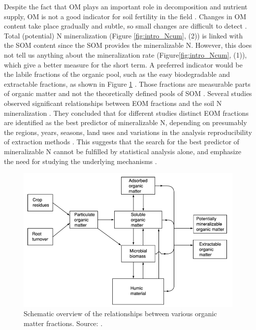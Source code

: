 \documentclass[10pt,twoside,dutch,english]{report}
\begin{document}
Despite the fact that OM plays an important role in decomposition and nutrient supply, OM is not a good indicator for soil fertility in the field \citep{Hanegraaf2009}. Changes in OM content take place gradually and subtle, so small changes are difficult to detect \citep{Ghani2002, Hanegraaf2009}. Total (potential) N mineralization (Figure \ref{fig:intro_Ncum}, (2)) is linked with the SOM content since the SOM provides the mineralizable N. However, this does not tell us anything about the mineralization rate (Figure\ref{fig:intro_Ncum}, (1)), which give a better measure for the short term.  A preferred indicator would be the labile fractions of the organic pool, such as the easy biodegradable and extractable fractions, as shown in Figure \ref{fig:intro_haynes} \citep{Haynes2005}. Those fractions are measurable parts of organic matter and not the theoretically defined pools of SOM \citep{Wander2004}. Several studies observed significant relationships between EOM fractions and the soil N mineralization \citep{Ros2011a,Ros2012}.  They concluded that for different studies distinct EOM fractions are identified as the best predictor of mineralizable N, depending on presumably the regions, years, seasons, land uses and variations in the analysis reproducibility of extraction methods \citep{Ros2011}. This suggests that the search for the best predictor of mineralizable N cannot be fulfilled by statistical analysis alone, and emphasize the need for studying the underlying mechanisms \citep{Ros2011}. 

	\begin{figure}[h]
		\includegraphics[width=1\linewidth]{intro_haynes}
		\caption{Schematic overview of the relationships between various organic matter fractions. Source: \citet{Haynes2005}.}
		\label{fig:intro_haynes}
	\end{figure}
\end{document}

